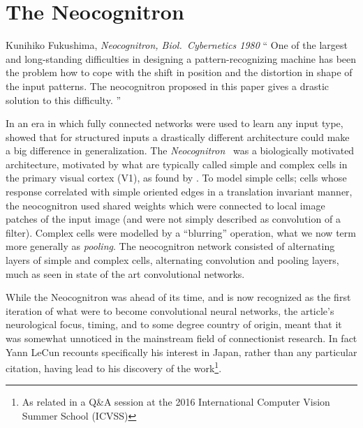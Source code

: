 \documentclass[thesis]{subfiles}
\begin{document}
\section{The Neocognitron}
	\begin{chapquote}{Kunihiko Fukushima, \textit{Neocognitron, 
				Biol.\ Cybernetics 1980}}
		`` One of the largest and long-standing difficulties in designing a pattern-recognizing machine has been the problem how to cope with the shift in position and the distortion in shape of the input patterns. The neocognitron proposed in this paper gives a drastic solution to this difficulty.
		''
	\end{chapquote}
	
	In an era in which fully connected networks were used to learn any input type, \citet{Fuk80} showed that for structured inputs a drastically different architecture could make a big difference in generalization. The \emph{Neocognitron}~\citep{Fuk80, fukushima2013artificial} was a biologically motivated architecture, motivated by what are typically called simple and complex cells in the primary visual cortex (V1), as found by \citet{Hubel1959a}. To model simple cells; cells whose response correlated with simple oriented edges in a translation invariant manner, the neocognitron used shared weights which were connected to local image patches of the input image (and were not simply described as convolution of a filter). Complex cells were modelled by a ``blurring'' operation, what we now term more generally as \emph{pooling}. The neocognitron network consisted of alternating layers of simple and complex cells, \ie alternating convolution and pooling layers, much as seen in state of the art convolutional networks.

	While the Neocognitron was ahead of its time, and is now recognized as the first iteration of what were to become convolutional neural networks, the article's neurological focus, timing, and to some degree country of origin, meant that it was somewhat unnoticed in the mainstream field of connectionist research. In fact Yann LeCun recounts specifically his interest in Japan, rather than any particular citation, having lead to his discovery of the work\footnote{As related in a Q\&A session at the 2016 International Computer Vision Summer School (ICVSS)}.
	
\end{document}
